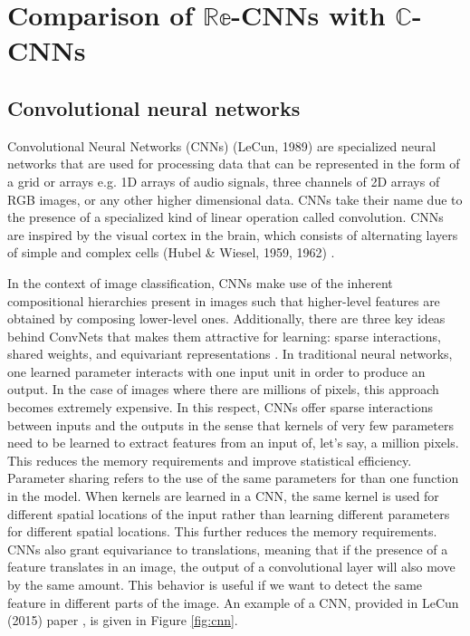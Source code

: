 \chapter{Comparison of $\mathbb{Re}$-CNNs with $\mathbb{C}$-CNNs}\label{chap:meth}
 
 
 \section{Convolutional neural networks}\label{cnn41}
 
 Convolutional Neural Networks (CNNs) (LeCun, 1989) \cite{lecun1989backpropagation} are specialized neural networks that are used for processing data that can be represented in the form of a grid or arrays e.g. 1D arrays of audio signals, three channels of 2D arrays of RGB images, or any other higher dimensional data. CNNs take their name due to the presence of a specialized kind of linear operation called convolution. CNNs are inspired by the visual cortex in the brain, which consists of alternating layers of simple and complex cells  (Hubel \& Wiesel, 1959, 1962) \cite{hubel1959receptive}\cite{hubel1962receptive}. 
 
In the context of image classification, CNNs make use of the inherent compositional hierarchies present in images such that higher-level features are obtained by composing lower-level ones. Additionally, there are three key ideas behind ConvNets that makes them attractive for learning: sparse interactions, shared weights, and equivariant representations \cite{DeepLearning}. In traditional neural networks, one learned parameter interacts with one input unit in order to produce an output. In the case of images where there are millions of pixels, this approach becomes extremely expensive. In this respect, CNNs offer sparse interactions between inputs and the outputs in the sense that kernels of very few parameters need to be learned to extract features from an input of, let's say, a million pixels. This reduces the memory requirements and improve statistical efficiency. Parameter sharing refers to the use of the same parameters for than one function in the model. When kernels are learned in a CNN, the same kernel is used for different spatial locations of the input rather than learning different parameters for different spatial locations. This further reduces the memory requirements. CNNs also grant equivariance to translations, meaning that if the presence of a feature translates in an image, the output of a convolutional layer will also move by the same amount. This behavior is useful if we want to detect the same feature in different parts of the image. An example of a CNN, provided in LeCun (2015) paper \cite{nature}, is given in Figure \ref{fig:cnn}.

